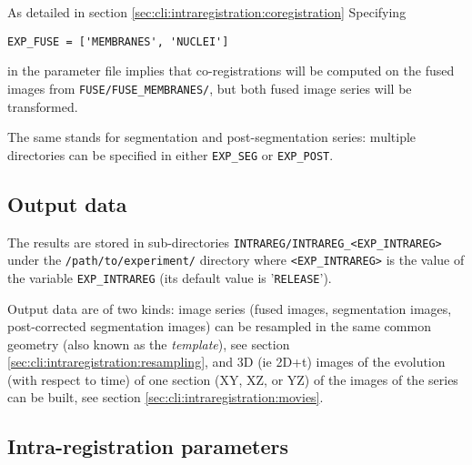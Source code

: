 As detailed in section \ref{sec:cli:intraregistration:coregistration} Specifying
\begin{verbatim}
EXP_FUSE = ['MEMBRANES', 'NUCLEI']
\end{verbatim}
in the parameter file implies that co-registrations will be computed on
the fused images from \texttt{FUSE/FUSE\_MEMBRANES/}, but both fused image series will be transformed.

The same stands for segmentation and post-segmentation series: multiple directories can be specified in either \texttt{EXP\_SEG} or \texttt{EXP\_POST}.

\subsection{Output data}

The results are stored in sub-directories
\texttt{INTRAREG/INTRAREG\_<EXP\_INTRAREG>} under the
\texttt{/path/to/experiment/} directory where \texttt{<EXP\_INTRAREG>} is the value of the variable \texttt{EXP\_INTRAREG} (its
default value is '\texttt{RELEASE}'). 

\mbox{}
\mbox{}

Output data are of two kinds: image series (fused images, segmentation
images, post-corrected segmentation images) can be resampled in the
same common geometry (also known as the \textit{template}), see
section \ref{sec:cli:intraregistration:resampling}, and 3D (ie 2D+t)
images of the evolution (with respect to time) of one section (XY, XZ,
or YZ) of the images of the series can be built, see
section \ref{sec:cli:intraregistration:movies}.




\subsection{Intra-registration parameters}

